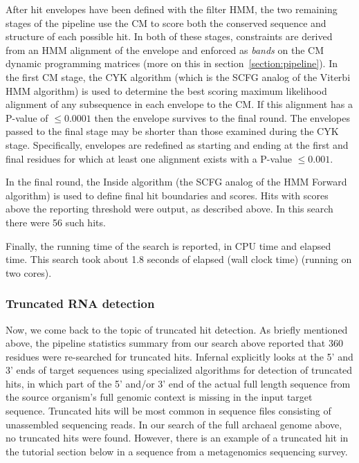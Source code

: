 After hit envelopes have been defined with the filter HMM, the two
remaining stages of the pipeline use the CM to score both the
conserved sequence and structure of each possible hit. In both of
these stages, constraints are derived from an HMM alignment of the
envelope and enforced as \emph{bands} on the CM dynamic programming
matrices (more on this in section~\ref{section:pipeline}). In the
first CM stage, the CYK algorithm (which is the SCFG analog of the
Viterbi HMM algorithm) is used to determine the best scoring maximum
likelihood alignment of any subsequence in each envelope to the CM. If
this alignment has a P-value of $\leq 0.0001$ then the envelope
survives to the final round. The envelopes passed to the final stage
may be shorter than those examined during the CYK stage. Specifically,
envelopes are redefined as starting and ending at the first and final
residues for which at least one alignment exists with a P-value $\leq
0.001$.

In the final round, the Inside algorithm (the SCFG analog of the HMM
Forward algorithm) is used to define final hit boundaries and
scores. Hits with scores above the reporting threshold were output, as
described above. In this search there were 56 such hits.

Finally, the running time of the search is reported, in CPU time and
elapsed time. This search took about 1.8 seconds of elapsed (wall
clock time) (running on two cores). 

\subsubsection{Truncated RNA detection}

Now, we come back to the topic of truncated hit detection.  As briefly
mentioned above, the pipeline statistics summary from our search above
reported that 360 residues were re-searched for truncated
hits. Infernal explicitly looks at the 5' and 3' ends of target
sequences using specialized algorithms for detection of truncated
hits, in which part of the 5' and/or 3' end of the actual full length
sequence from the source organism's full genomic context is missing in
the input target sequence. Truncated hits will be most common in
sequence files consisting of unassembled sequencing reads. In our
search of the full archaeal genome above, no truncated hits were
found. However, there is an example of a truncated hit in the
 tutorial section below in a sequence from a metagenomics
sequencing survey.

